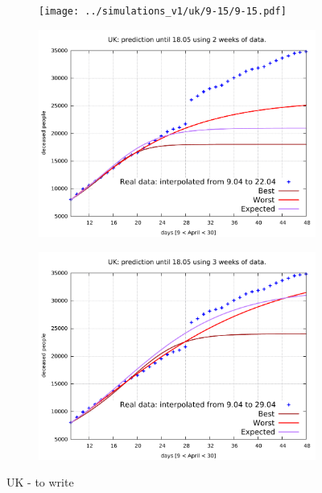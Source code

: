 \documentclass[8pt]{article}
\begin{document}
\begin{figure}[h!]
  \centering
  \begin{subfigure}[b]{0.45\linewidth}
  \texttt{[image: ../simulations\_v1/uk/9-15/9-15.pdf]}
  \end{subfigure}
  \begin{subfigure}[b]{0.45\linewidth}
    \includegraphics[width=\linewidth]{../simulations_v1/uk/9-22/9-22.pdf}
  \end{subfigure}
  \begin{subfigure}[b]{0.45\linewidth}
  \includegraphics[width=\linewidth]{../simulations_v1/uk/9-29/9-29.pdf}
  \end{subfigure}
	\caption{UK - to write}
\end{figure}
\end{document}

